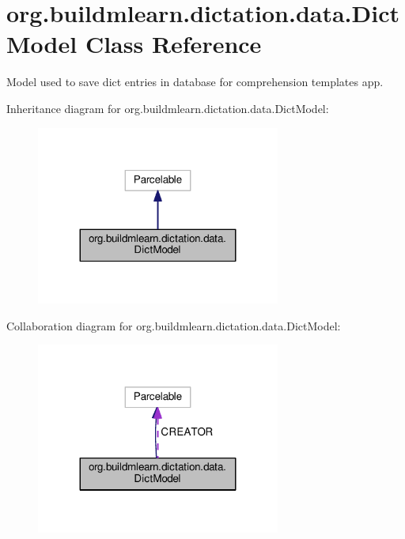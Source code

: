 \hypertarget{classorg_1_1buildmlearn_1_1dictation_1_1data_1_1DictModel}{}\section{org.\+buildmlearn.\+dictation.\+data.\+Dict\+Model Class Reference}
\label{classorg_1_1buildmlearn_1_1dictation_1_1data_1_1DictModel}


Model used to save dict entries in database for comprehension template\textquotesingle{}s app.  




Inheritance diagram for org.\+buildmlearn.\+dictation.\+data.\+Dict\+Model\+:
\nopagebreak
\begin{figure}[H]
\begin{center}
\leavevmode
\includegraphics[width=227pt]{classorg_1_1buildmlearn_1_1dictation_1_1data_1_1DictModel__inherit__graph}
\end{center}
\end{figure}


Collaboration diagram for org.\+buildmlearn.\+dictation.\+data.\+Dict\+Model\+:
\nopagebreak
\begin{figure}[H]
\begin{center}
\leavevmode
\includegraphics[width=227pt]{classorg_1_1buildmlearn_1_1dictation_1_1data_1_1DictModel__coll__graph}
\end{center}
\end{figure}
